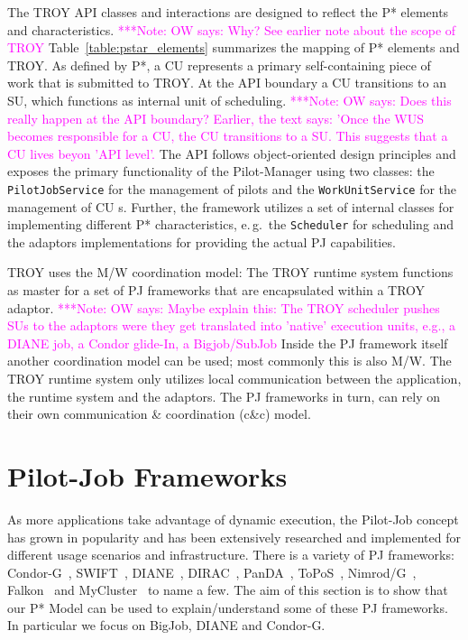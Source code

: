 \documentclass[conference,final]{IEEEtran}
\newcommand{\note}[1]{ {\textcolor{magenta} { ***Note: #1 }}}
\newcommand{\note}[1]{}
\newcommand{\cu}{CU\xspace}
\newcommand{\upp}{\vspace*{-0.5em}}
\begin{document}
The TROY API classes and interactions are designed to reflect the P*
elements and characteristics.
\note{OW says: Why? See earlier note about the scope of TROY}
Table~\ref{table:pstar_elements}
summarizes the mapping of P* elements and TROY. As defined by P*, a \cu 
represents a primary self-containing piece of work that is submitted
to TROY. At the API boundary a \cu  transitions to an SU, which
functions as internal unit of scheduling.
\note{OW says: Does this really happen at the API boundary? Earlier, 
the text says: 'Once the WUS becomes responsible for a CU, the CU
transitions to a SU. This suggests that a CU lives beyon 'API level'.}
The API follows
object-oriented design principles and exposes the primary
functionality of the Pilot-Manager using two classes: the
\texttt{PilotJobService} for the management of pilots and the
\texttt{WorkUnitService} for the management of \cu s. Further, the
framework utilizes a set of internal classes for implementing
different P* characteristics, e.\,g.\ the \texttt{Scheduler} for
scheduling and the adaptors implementations for providing the actual
PJ capabilities.

TROY uses the M/W coordination model: The TROY runtime system
functions as master for a set of PJ frameworks that are encapsulated
within a TROY adaptor.
\note{OW says: Maybe explain this: The TROY scheduler pushes SUs
to the adaptors were they get translated into 'native' execution units,
e.g., a DIANE job, a Condor glide-In, a Bigjob/SubJob}
 Inside the PJ framework itself another
coordination model can be used; most commonly this is also M/W. The
TROY runtime system only utilizes local communication between the
application, the runtime system and the adaptors. The PJ frameworks in
turn, can rely on their own communication \& coordination (c\&c)
model.

\section{Pilot-Job Frameworks\upp\upp}

As more applications take advantage of dynamic execution, the
Pilot-Job concept has grown in popularity and has been extensively
researched and implemented for different usage scenarios and
infrastructure. There is a variety of PJ frameworks:
Condor-G~\cite{condor-g}, SWIFT~\cite{Wilde2011},
DIANE~\cite{Moscicki:908910}, DIRAC~\cite{1742-6596-219-6-062049},
PanDA~\cite{1742-6596-219-6-062041}, ToPoS~\cite{topos},
Nimrod/G~\cite{10.1109/HPC.2000.846563}, Falkon~\cite{1362680} and
MyCluster~\cite{1652061} to name a few. The aim of this section is to
show that our P* Model can be used to explain/understand some of these
PJ frameworks. In particular we focus on BigJob, DIANE and Condor-G.
\end{document}
